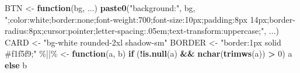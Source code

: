 \documentclass[
]{article}
\newenvironment{Shaded}{\begin{snugshade}}{\end{snugshade}}
\newcommand{\AttributeTok}[1]{\textcolor[rgb]{0.13,0.29,0.53}{#1}}
\newcommand{\ControlFlowTok}[1]{\textcolor[rgb]{0.13,0.29,0.53}{\textbf{#1}}}
\newcommand{\DecValTok}[1]{\textcolor[rgb]{0.00,0.00,0.81}{#1}}
\newcommand{\FunctionTok}[1]{\textcolor[rgb]{0.13,0.29,0.53}{\textbf{#1}}}
\newcommand{\NormalTok}[1]{#1}
\newcommand{\OtherTok}[1]{\textcolor[rgb]{0.56,0.35,0.01}{#1}}
\newcommand{\SpecialCharTok}[1]{\textcolor[rgb]{0.81,0.36,0.00}{\textbf{#1}}}
\newcommand{\StringTok}[1]{\textcolor[rgb]{0.31,0.60,0.02}{#1}}
\begin{document}
\begin{Shaded}
\begin{Highlighting}[]
\NormalTok{BTN    }\OtherTok{\textless{}{-}} \ControlFlowTok{function}\NormalTok{(bg, ...) }\FunctionTok{paste0}\NormalTok{(}\StringTok{"background:"}\NormalTok{, bg, }\StringTok{";color:white;border:none;font{-}weight:700;font{-}size:10px;padding:8px 14px;border{-}radius:8px;cursor:pointer;letter{-}spacing:.05em;text{-}transform:uppercase;"}\NormalTok{, ...)}
\NormalTok{CARD   }\OtherTok{\textless{}{-}} \StringTok{"bg{-}white rounded{-}2xl shadow{-}sm"}
\NormalTok{BORDER }\OtherTok{\textless{}{-}} \StringTok{"border:1px solid \#f1f5f9;"}
\StringTok{\textasciigrave{}}\AttributeTok{\%||\%}\StringTok{\textasciigrave{}} \OtherTok{\textless{}{-}} \ControlFlowTok{function}\NormalTok{(a, b) }\ControlFlowTok{if}\NormalTok{ (}\SpecialCharTok{!}\FunctionTok{is.null}\NormalTok{(a) }\SpecialCharTok{\&\&} \FunctionTok{nchar}\NormalTok{(}\FunctionTok{trimws}\NormalTok{(a)) }\SpecialCharTok{\textgreater{}} \DecValTok{0}\NormalTok{) a }\ControlFlowTok{else}\NormalTok{ b}


\end{Highlighting}
\end{Shaded}
\end{document}
